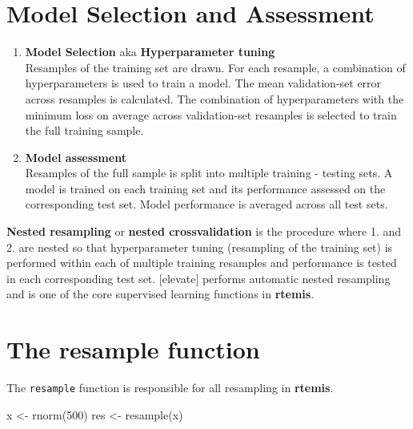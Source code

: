 \documentclass[
]{book}
\newenvironment{Shaded}{\begin{snugshade}}{\end{snugshade}}
\newcommand{\DecValTok}[1]{\textcolor[rgb]{0.00,0.00,0.81}{#1}}
\newcommand{\FunctionTok}[1]{\textcolor[rgb]{0.00,0.00,0.00}{#1}}
\newcommand{\NormalTok}[1]{#1}
\newcommand{\OtherTok}[1]{\textcolor[rgb]{0.56,0.35,0.01}{#1}}
\providecommand{\tightlist}{%
  \setlength{\itemsep}{0pt}\setlength{\parskip}{0pt}}
\begin{document}
\hypertarget{model-selection-and-assessment}{%
\section{Model Selection and Assessment}\label{model-selection-and-assessment}}

\begin{enumerate}
\def\labelenumi{\arabic{enumi}.}
\tightlist
\item
  \textbf{Model Selection} aka \textbf{Hyperparameter tuning}\\
  Resamples of the training set are drawn. For each resample, a combination of hyperparameters is used to train a model. The mean validation-set error across resamples is calculated. The combination of hyperparameters with the minimum loss on average across validation-set resamples is selected to train the full training sample.
\item
  \textbf{Model assessment}\\
  Resamples of the full sample is split into multiple training - testing sets. A model is trained on each training set and its performance assessed on the corresponding test set. Model performance is averaged across all test sets.
\end{enumerate}

\textbf{Nested resampling} or \textbf{nested crossvalidation} is the procedure where 1. and 2. are nested so that hyperparameter tuning (resampling of the training set) is performed within each of multiple training resamples and performance is tested in each corresponding test set. {[}elevate{]} performs automatic nested resampling and is one of the core supervised learning functions in \textbf{rtemis}.

\hypertarget{the-resample-function}{%
\section{The resample function}\label{the-resample-function}}

The \texttt{resample} function is responsible for all resampling in \textbf{rtemis}.

\begin{Shaded}
\begin{Highlighting}[]
\NormalTok{x }\OtherTok{\textless{}{-}} \FunctionTok{rnorm}\NormalTok{(}\DecValTok{500}\NormalTok{)}
\NormalTok{res }\OtherTok{\textless{}{-}} \FunctionTok{resample}\NormalTok{(x)}
\end{Highlighting}
\end{Shaded}
\end{document}
